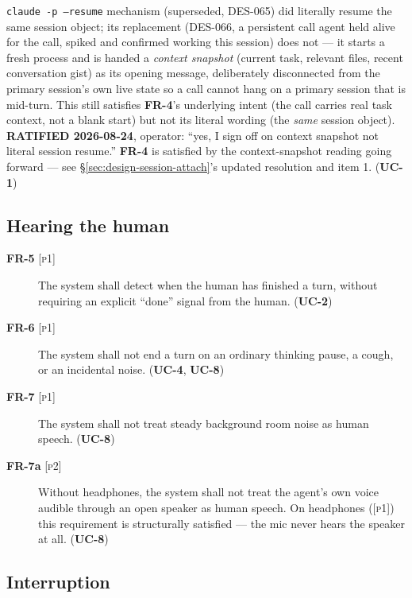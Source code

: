 \documentclass[a4paper,11pt]{report}
\newcommand{\uc}[1]{\textbf{UC-#1}}
\newcommand{\fr}[1]{\textbf{FR-#1}}
\newcommand{\pone}{\textsc{[p1]}}
\newcommand{\ptwo}{\textsc{[p2]}}
\begin{document}
\begin{description}
    \texttt{claude -p --resume} mechanism (superseded, DES-065) did
    literally resume the same session object; its replacement (DES-066, a
    persistent call agent held alive for the call, spiked and confirmed
    working this session) does not --- it starts a fresh process and is
    handed a \emph{context snapshot} (current task, relevant files,
    recent conversation gist) as its opening message, deliberately
    disconnected from the primary session's own live state so a call
    cannot hang on a primary session that is mid-turn. This still
    satisfies \fr{4}'s underlying intent (the call carries real task
    context, not a blank start) but not its literal wording (the
    \emph{same} session object). \textbf{RATIFIED 2026-08-24}, operator:
    ``yes, I sign off on context snapshot not literal session resume.''
    \fr{4} is satisfied by the context-snapshot reading going forward ---
    see \S\ref{sec:design-session-attach}'s updated resolution and
     item 1. (\uc{1})
\end{description}

\subsection{Hearing the human}

\begin{description}
  \item[\fr{5} \pone{}] The system shall detect when the human has
    finished a turn, without requiring an explicit ``done'' signal from
    the human. (\uc{2})
  \item[\fr{6} \pone{}] The system shall not end a turn on an ordinary
    thinking pause, a cough, or an incidental noise. (\uc{4}, \uc{8})
  \item[\fr{7} \pone{}] The system shall not treat steady background room
    noise as human speech. (\uc{8})
  \item[\fr{7a} \ptwo{}] Without headphones, the system shall not treat the
    agent's own voice audible through an open speaker as human speech.
    On headphones (\pone{}) this requirement is structurally satisfied ---
    the mic never hears the speaker at all. (\uc{8})
\end{description}

\subsection{Interruption}
\end{document}
